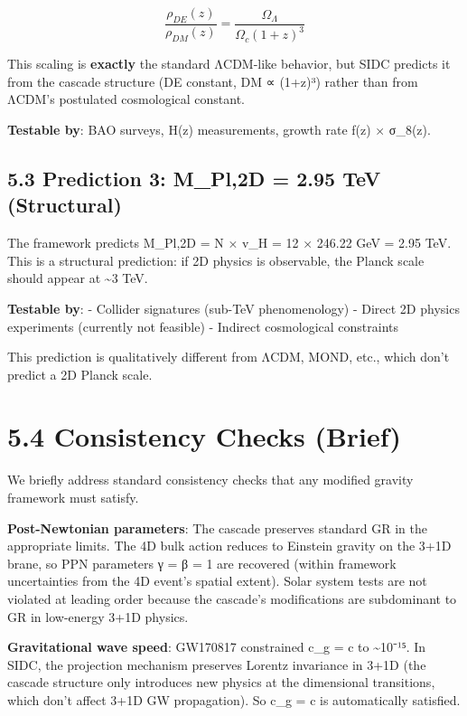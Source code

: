\documentclass[11pt,a4paper]{article}
\begin{document}
\[\frac{\rho_{DE}(z)}{\rho_{DM}(z)} = \frac{\Omega_\Lambda}{\Omega_c (1+z)^3}\]

This scaling is \textbf{exactly} the standard ΛCDM-like behavior, but
SIDC predicts it from the cascade structure (DE constant, DM ∝ (1+z)³)
rather than from ΛCDM's postulated cosmological constant.

\textbf{Testable by}: BAO surveys, H(z) measurements, growth rate f(z) ×
σ\_8(z).

\hypertarget{prediction-3-m_pl2d-2.95-tev-structural}{%
\subsection{5.3 Prediction 3: M\_Pl,2D = 2.95 TeV
(Structural)}\label{prediction-3-m_pl2d-2.95-tev-structural}}

The framework predicts M\_Pl,2D = N × v\_H = 12 × 246.22 GeV = 2.95 TeV.
This is a structural prediction: if 2D physics is observable, the Planck
scale should appear at \textasciitilde3 TeV.

\textbf{Testable by}: - Collider signatures (sub-TeV phenomenology) -
Direct 2D physics experiments (currently not feasible) - Indirect
cosmological constraints

This prediction is qualitatively different from ΛCDM, MOND, etc., which
don't predict a 2D Planck scale.

\hypertarget{consistency-checks-brief}{%
\section{5.4 Consistency Checks
(Brief)}\label{consistency-checks-brief}}

We briefly address standard consistency checks that any modified gravity
framework must satisfy.

\textbf{Post-Newtonian parameters}: The cascade preserves standard GR in
the appropriate limits. The 4D bulk action reduces to Einstein gravity
on the 3+1D brane, so PPN parameters γ = β = 1 are recovered (within
framework uncertainties from the 4D event's spatial extent). Solar
system tests are not violated at leading order because the cascade's
modifications are subdominant to GR in low-energy 3+1D physics.

\textbf{Gravitational wave speed}: GW170817 constrained c\_g = c to
\textasciitilde10⁻¹⁵. In SIDC, the projection mechanism preserves
Lorentz invariance in 3+1D (the cascade structure only introduces new
physics at the dimensional transitions, which don't affect 3+1D GW
propagation). So c\_g = c is automatically satisfied.
\end{document}
